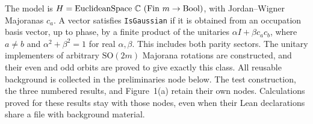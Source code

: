 The model is $H=\mathrm{EuclideanSpace}\ \C\ (\mathrm{Fin}\ m\to\mathrm{Bool})$,
with Jordan--Wigner Majoranas $c_a$. A vector satisfies \texttt{IsGaussian} if
it is obtained from an occupation basis vector, up to phase, by a finite product
of the unitaries $\alpha I+\beta c_a c_b$, where $a\ne b$ and
$\alpha^2+\beta^2=1$ for real $\alpha,\beta$. This includes both parity sectors.
The unitary implementers of arbitrary $\mathrm{SO}(2m)$ Majorana rotations
are constructed, and their even and odd orbits are proved to give exactly this class.
All reusable background is collected in the preliminaries node below.
The test construction, the three numbered results, and Figure~1(a) retain
their own nodes. Calculations proved for these results stay with those nodes,
even when their Lean declarations share a file with background material.

